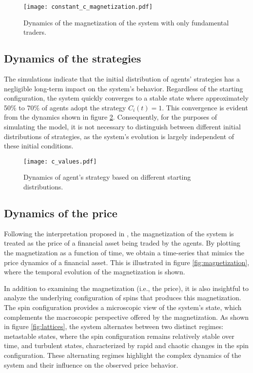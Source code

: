 \begin{figure}[H]
    \centering
    \texttt{[image: constant\_c\_magnetization.pdf]}
    \caption{Dynamics of the magnetization of the system with only fundamental traders.}
    \label{fig:fundamental_traders}
\end{figure}

\subsection{Dynamics of the strategies}
The simulations indicate that the initial distribution of agents' strategies has a negligible long-term impact on the system's behavior. Regardless of the starting configuration, the system quickly converges to a stable state where approximately 50\% to 70\% of agents adopt the strategy $C_i(t) = 1$. This convergence is evident from the dynamics shown in figure \ref{fig:strategies}. Consequently, for the purposes of simulating the model, it is not necessary to distinguish between different initial distributions of strategies, as the system's evolution is largely independent of these initial conditions.

\begin{figure}[H]
    \centering
    \texttt{[image: c\_values.pdf]}
    \caption{Dynamics of agent's strategy based on different starting distributions.}
    \label{fig:strategies}
\end{figure}

\subsection{Dynamics of the price}
Following the interpretation proposed in \cite{bornholdt}, the magnetization of the system is treated as the price of a financial asset being traded by the agents. By plotting the magnetization as a function of time, we obtain a time-series that mimics the price dynamics of a financial asset. This is illustrated in figure \ref{fig:magnetization}, where the temporal evolution of the magnetization is shown.

In addition to examining the magnetization (i.e., the price), it is also insightful to analyze the underlying configuration of spins that produces this magnetization. The spin configuration provides a microscopic view of the system's state, which complements the macroscopic perspective offered by the magnetization. As shown in figure \ref{fig:lattices}, the system alternates between two distinct regimes: metastable states, where the spin configuration remains relatively stable over time, and turbulent states, characterized by rapid and chaotic changes in the spin configuration. These alternating regimes highlight the complex dynamics of the system and their influence on the observed price behavior.

